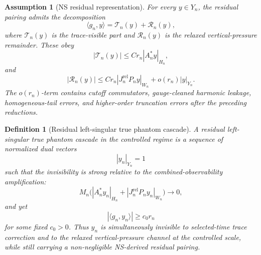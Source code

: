 \documentclass[11pt]{article}
\numberwithin{equation}{section}
\newtheorem{definition}[theorem]{Definition}
\newtheorem{assumption}[theorem]{Assumption}
\begin{document}
\begin{assumption}[NS residual representation]
For every \(y\in Y_n\), the residual pairing admits the decomposition
\begin{equation}
\langle g_n,y\rangle =
\mathcal T_n(y)
+
\mathcal R_n(y),
\label{eq:tag-10-247}
\end{equation}
where \(\mathcal T_n(y)\) is the trace-visible part and \(\mathcal R_n(y)\) is the relaxed vertical-pressure remainder. These obey
\begin{equation}
|\mathcal T_n(y)|
\le
C r_n|A_n^*y|_{H_n},
\label{eq:tag-10-248}
\end{equation}
and
\begin{equation}
|\mathcal R_n(y)|
\le
C r_n|J_n^{\mathrm{rel}}P_n y|_{W_n}
+
o(r_n)|y|_{Y_n}.
\label{eq:tag-10-249}
\end{equation}
The \(o(r_n)\)-term contains cutoff commutators, gauge-cleaned harmonic leakage, homogeneous-tail errors, and higher-order truncation errors after the preceding reductions.
\end{assumption}

\begin{definition}[Residual left-singular true phantom cascade]
A residual left-singular true phantom cascade in the controlled regime is a sequence of normalized dual vectors
\[
|y_n|_{Y_n}=1
\]
such that the invisibility is strong relative to the combined-observability amplification:
\begin{equation}
M_n\Big(
|A_n^*y_n|_{H_n}
+
|J_n^{\mathrm{rel}}P_n y_n|_{W_n}
\Big)
\to0,
\label{eq:tag-10-250}
\end{equation}
and yet
\begin{equation}
|\langle g_n,y_n\rangle|
\ge c_0r_n
\label{eq:tag-10-252}
\end{equation}
for some fixed \(c_0>0\). Thus \(y_n\) is simultaneously invisible to selected-time trace correction and to the relaxed vertical-pressure channel at the controlled scale, while still carrying a non-negligible NS-derived residual pairing.
\end{definition}
\end{document}
